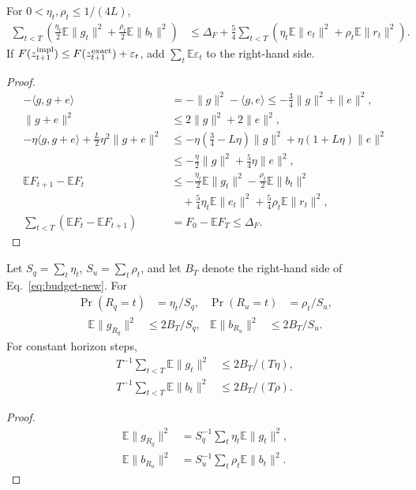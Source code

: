 \begin{theorem}
\label{thm:budget-new}
For $0<\eta_t,\rho_t\le1/(4L)$,
\begin{align}\label{eq:budget-new}
 \sum_{t<T}\left(\frac{\eta_t}{2}\mathbb E\|g_t\|^2+
 \frac{\rho_t}{2}\mathbb E\|b_t\|^2\right)
 &\le\Delta_F+
 \frac54\sum_{t<T}\left(\eta_t\mathbb E\|e_t\|^2+
 \rho_t\mathbb E\|r_t\|^2\right).
\end{align}
If $F(z_{t+1}^{\rm impl})\le F(z_{t+1}^{\rm exact})+\varepsilon_t$,
add $\sum_t\mathbb E\varepsilon_t$ to the right-hand side.
\end{theorem}
\begin{proof}
\begin{align}
 -\langle g,g+e\rangle
 &=-\|g\|^2-\langle g,e\rangle
 \le-\tfrac34\|g\|^2+\|e\|^2,\\
 \|g+e\|^2&\le2\|g\|^2+2\|e\|^2,\\
 -\eta\langle g,g+e\rangle+\tfrac L2\eta^2\|g+e\|^2
 &\le-\eta(\tfrac34-L\eta)\|g\|^2+
 \eta(1+L\eta)\|e\|^2\\
 &\le-\tfrac\eta2\|g\|^2+\tfrac54\eta\|e\|^2,\\
 \mathbb EF_{t+1}-\mathbb EF_t
 &\le-\tfrac{\eta_t}2\mathbb E\|g_t\|^2
 -\tfrac{\rho_t}2\mathbb E\|b_t\|^2\\
 &\quad+\tfrac54\eta_t\mathbb E\|e_t\|^2
 +\tfrac54\rho_t\mathbb E\|r_t\|^2,\\
 \sum_{t<T}(\mathbb EF_t-\mathbb EF_{t+1})
 &=F_0-\mathbb EF_T\le\Delta_F.
\end{align}
\end{proof}

\begin{corollary}
Let $S_q=\sum_t\eta_t$, $S_u=\sum_t\rho_t$, and let $B_T$ denote the right-hand side of Eq.~\eqref{eq:budget-new}. For
\begin{align}
 \Pr(R_q=t)&=\eta_t/S_q,&\Pr(R_u=t)&=\rho_t/S_u,
\end{align}
\begin{align}
 \mathbb E\|g_{R_q}\|^2&\le2B_T/S_q,&
 \mathbb E\|b_{R_u}\|^2&\le2B_T/S_u.
\end{align}
For constant horizon steps,
\begin{align}
 T^{-1}\sum_{t<T}\mathbb E\|g_t\|^2&\le2B_T/(T\eta),\\
 T^{-1}\sum_{t<T}\mathbb E\|b_t\|^2&\le2B_T/(T\rho).
\end{align}
\end{corollary}
\begin{proof}
\begin{align}
 \mathbb E\|g_{R_q}\|^2
 &=S_q^{-1}\sum_t\eta_t\mathbb E\|g_t\|^2,\\
 \mathbb E\|b_{R_u}\|^2
 &=S_u^{-1}\sum_t\rho_t\mathbb E\|b_t\|^2.
\end{align}
\end{proof}

